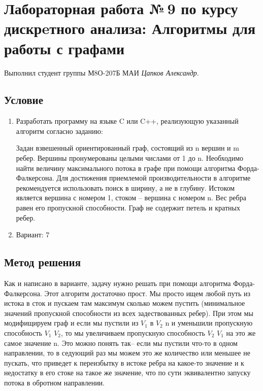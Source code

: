 \documentclass[12pt]{article}
\begin{document}
\section*{Лабораторная работа №\,9 по курсу дискрeтного анализа: Алгоритмы для работы с графами}

Выполнил студент группы М8О-207Б МАИ \textit{Цапков Александр}.

\subsection*{Условие}

\begin{enumerate}
\item Разработать программу на языке C или C++, реализующую указанный алгоритм согласно заданию:

Задан взвешенный ориентированный граф, состоящий из n вершин и m ребер. Вершины пронумерованы целыми числами от 1 до n. Необходимо найти величину максимального потока в графе при помощи алгоритма Форда-Фалкерсона. Для достижения приемлемой производительности в алгоритме рекомендуется использовать поиск в ширину, а не в глубину. Истоком является вершина с номером 1, стоком – вершина с номером n. Вес ребра равен его пропускной способности. Граф не содержит петель и кратных ребер.

\item Вариант: 7

\end{enumerate}

\subsection*{Метод решения}
Как и написано в варианте, задачу нужно решать при помощи алгоритма Форда-Фалкерсона. Этот алгоритм достаточно прост. Мы просто ищем любой путь из истока в сток и пускаем там максимум сколько можем пустить (минимальное значений пропускной способности из всех задествованных ребер). При этом мы модифищируем граф и если мы пустили из $V_1$ в $V_2$ n и уменьшили пропускную способность $V_1$ $V_2$, то мы увеличиваем пропускную способность $V_2$ $V_1$ на это же самое значение n. Это можно понять так-- если мы пустили что-то в одном направлении, то в седующий раз мы можем это же количество или меньшее не пускать, что приведет к переизбытку в истоке ребра на какое-то значение и к недостатку в его стоке на такое же значение, что по сути эквивалентно запуску потока в обротном направлении.
\end{document}
